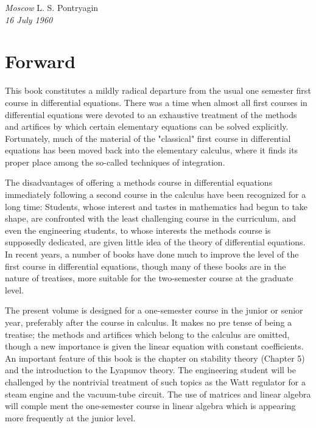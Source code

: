 \documentclass[10pt,a5paper]{book}
\theoremstyle{plain}
\theoremstyle{definition}
\theoremstyle{remark}
\begin{document}
\vspace{2em} %

\noindent
\textit{Moscow} \hfill L. S. Pontryagin \\
\textit{16 July 1960}

\chapter*{Forward}
This book constitutes a mildly radical departure from the usual one semester first course in differential equations. There was a time when
almost all first courses in differential equations were devoted to an
exhaustive treatment of the methods and artifices by which certain ele­mentary equations can be solved explicitly. Fortunately, much of the
material of the "classical" first course in differential equations has been
moved back into the elementary calculus, where it finds its proper place
among the so-called techniques of integration.

The disadvantages of offering a methods course in differential equations
immediately following a second course in the calculus have been recog­nized for a long time: Students, whose interest and tastes in mathematics
had begun to take shape, are confronted with the least challenging course
in the curriculum, and even the engineering students, to whose interests
the methods course is supposedly dedicated, are given little idea of the
theory of differential equations. In recent years, a number of books have
done much to improve the level of the first course in differential equations,
though many of these books are in the nature of treatises, more suitable
for the two-semester course at the graduate level.

The present volume is designed for a one-semester course in the junior
or senior year, preferably after the course in calculus. It makes no pre­
tense of being a treatise; the methods and artifices which belong to the
calculus are omitted, though a new importance is given the linear equation
with constant coefficients. An important feature of this book is the chapter
on stability theory (Chapter 5) and the introduction to the Lyapunov
theory. The engineering student will be challenged by the nontrivial
treatment of such topics as the Watt regulator for a steam engine and the
vacuum-tube circuit. The use of matrices and linear algebra will comple­
ment the one-semester course in linear algebra which is appearing more
frequently at the junior level.
\end{document}
